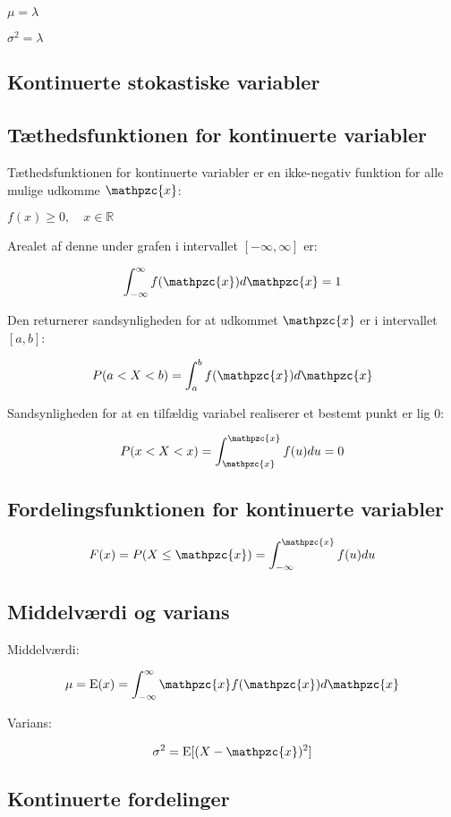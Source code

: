 \documentclass{article}
\newcommand{\mellemrum}{\vspace{2 ex}}
\newcommand{\cent}[1]{ \mellemrum \begin{center} #1\end{center} \mellemrum }
\newcommand{\op}[1]{\operatorname{#1}}
\newcommand{\script}[1]{\mathpzc{#1}}
\newcommand{\doubleR}{\mathbb{R}}
\begin{document}
	\cent{$\mu = \lambda$}
	
	\cent{$\sigma^2 =\lambda $}
	
	\subsection{Kontinuerte stokastiske variabler}
	
	\subsection{Tæthedsfunktionen for kontinuerte variabler}
	
	Tæthedsfunktionen for kontinuerte variabler er en ikke-negativ funktion for alle mulige udkomme $\script{x}$:
	
	\cent{$f(x)\geq 0, \quad x \in \doubleR$}

	Arealet af denne under grafen i intervallet $[-\infty,\infty]$ er:
	
	\cent{$$ \int_{-\infty}^{\infty} f(\script{x})d\script{x} = 1 $$}
	
	Den returnerer sandsynligheden for at udkommet $\script{x}$ er i intervallet $[a,b]$:
	
	\cent{$$P(a < X < b) = \int_{a}^{b}f(\script{x})d\script{x}$$}
	
	Sandsynligheden for at en tilfældig variabel realiserer et bestemt punkt er lig 0:
	
	\cent{$$ P(x < X < x) = \int_{\script{x}}^{\script{x}}f(u)du = 0 $$}
	
	\subsection{Fordelingsfunktionen for kontinuerte variabler}
	
	\cent{$$ F(x) = P(X \leq \script{x}) = \int_{-\infty}^{\script{x}} f(u)du $$}
	
	\subsection{Middelværdi og varians}
	
	Middelværdi:
	
	\cent{$$ \mu = \op{E}(x) = \int_{-\infty}^{\infty} \script{x}f(\script{x})d\script{x} $$}
	
	Varians:
	
	\cent{$$ \sigma^2 = \op{E}[(X-\script{x})^2] $$}
	
	\subsection{Kontinuerte fordelinger}
	
\end{document}
